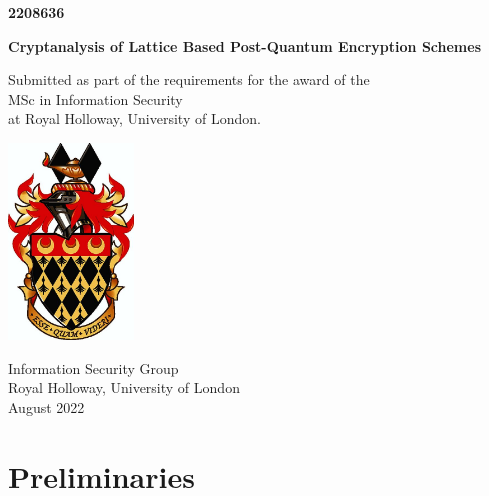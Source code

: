 \documentclass[a4paper, 10pt]{article}
\theoremstyle{definition}
\begin{document}
\begin{titlepage}
    \begin{center}
        \Large
        \textbf{2208636}

        \vspace{5cm}
        \huge
        \textbf{Cryptanalysis of Lattice Based Post-Quantum Encryption Schemes}


        \vspace{3cm}
        


        \large
        Submitted as part of the requirements for the award of the\\MSc in Information Security\\at Royal Holloway, University of London.

        \vspace{1cm}


        \includegraphics[width = 0.25\textwidth]{Royal_Holloway_College,_University_of_London-3251331149.jpg}

        
        \vspace{1cm}
        Information Security Group\\Royal Holloway, University of London\\August 2022



    \end{center}
\end{titlepage}

\tableofcontents

\newpage

\section{Preliminaries}
\end{document}
